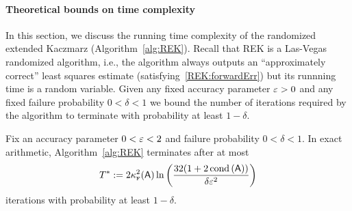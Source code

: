 \paragraph{Theoretical bounds on time complexity}
%
In this section, we discuss the running time complexity of the randomized extended Kaczmarz (Algorithm~\ref{alg:REK}). Recall that REK is a Las-Vegas randomized algorithm, i.e., the algorithm always outputs an ``approximately correct'' least squares estimate (satisfying~\eqref{REK:forwardErr}) but its runnning time is a random variable. Given any fixed accuracy parameter $\varepsilon>0$ and any fixed failure probability $0<\delta<1$ we bound the number of iterations required by the algorithm to terminate with probability at least $1-\delta$.
\begin{lemma}\label{lem:runtime}
Fix an accuracy parameter $0<\varepsilon<2$ and failure probability $0<\delta<1$. In exact arithmetic, Algorithm~\ref{alg:REK} terminates after at most
	\[T^*:=2\kappa^2_{\textrm{\tiny F}}({\mathsf{A} }) \ln \left(\frac{32(1+2\operatorname{\mathrm{cond}}\left({\mathsf{A} }\right))}{\delta\varepsilon^2}\right)\]
iterations with probability at least $1-\delta$.
\end{lemma}
